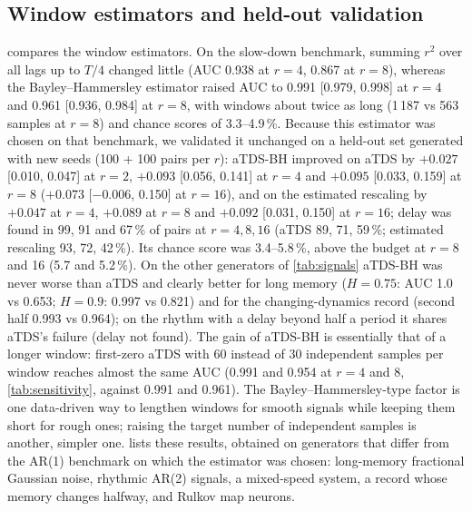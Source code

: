 \documentclass[11pt,a4paper]{article}
\begin{document}
\subsection{Window estimators and held-out validation}
\label{sec:res-bh}
 compares the window estimators. On the slow-down benchmark, summing $r^2$ over all lags up to $T/4$ changed little (AUC 0.938 at $r = 4$, 0.867 at $r = 8$), whereas the Bayley--Hammersley estimator raised AUC to 0.991 [0.979, 0.998] at $r = 4$ and 0.961 [0.936, 0.984] at $r = 8$, with windows about twice as long (1\,187 vs 563 samples at $r = 8$) and chance scores of 3.3--4.9\,\%. Because this estimator was chosen on that benchmark, we validated it unchanged on a held-out set generated with new seeds (100 + 100 pairs per $r$): aTDS-BH improved on aTDS by $+0.027$ [0.010, 0.047] at $r = 2$, $+0.093$ [0.056, 0.141] at $r = 4$ and $+0.095$ [0.033, 0.159] at $r = 8$ ($+0.073$ [$-0.006$, 0.150] at $r = 16$), and on the estimated rescaling by $+0.047$ at $r = 4$, $+0.089$ at $r = 8$ and $+0.092$ [0.031, 0.150] at $r = 16$; delay was found in 99, 91 and 67\,\% of pairs at $r = 4, 8, 16$ (aTDS 89, 71, 59\,\%; estimated rescaling 93, 72, 42\,\%). Its chance score was 3.4--5.8\,\%, above the budget at $r = 8$ and 16 (5.7 and 5.2\,\%). On the other generators of \cref{tab:signals} aTDS-BH was never worse than aTDS and clearly better for long memory ($H = 0.75$: AUC 1.0 vs 0.653; $H = 0.9$: 0.997 vs 0.821) and for the changing-dynamics record (second half 0.993 vs 0.964); on the rhythm with a delay beyond half a period it shares aTDS's failure (delay not found). The gain of aTDS-BH is essentially that of a longer window: first-zero aTDS with 60 instead of 30 independent samples per window reaches almost the same AUC (0.991 and 0.954 at $r = 4$ and 8, \cref{tab:sensitivity}, against 0.991 and 0.961). The Bayley--Hammersley-type factor is one data-driven way to lengthen windows for smooth signals while keeping them short for rough ones; raising the target number of independent samples is another, simpler one.  lists these results, obtained on generators that differ from the AR(1) benchmark on which the estimator was chosen: long-memory fractional Gaussian noise, rhythmic AR(2) signals, a mixed-speed system, a record whose memory changes halfway, and Rulkov map neurons.
\end{document}
